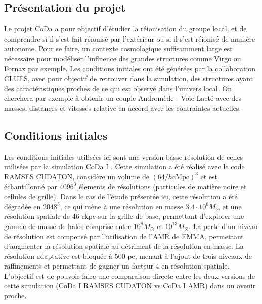 \subsection{Présentation du projet}

Le projet \ac{CoDa} a pour objectif d'étudier la réionisation du groupe local, et de comprendre si il s'est fait réionisé par l'extérieur ou si il s'est réionisé de manière autonome.
Pour se faire, un contexte cosmologique suffisamment large est nécessaire pour modéliser l'influence des grandes structures comme Virgo ou Fornax par exemple.
Les conditions initiales ont été générées par la collaboration \ac{CLUES}, avec pour objectif de retrouver dans la simulation, des structures ayant des caractéristiques proches de ce qui est observé dans l'univers local.
On cherchera par exemple à obtenir un couple Andromède - Voie Lacté avec des masses, distances et vitesses relative en accord avec les contraintes actuelles.

\subsection{Conditions initiales}
\label{sec:ICCODA}
Les conditions initiales utilisées ici sont une version basse résolution de celles utilisées par la simulation \ac{CoDa} I \citep{ocvirk_cosmic_2015}.
Cette simulation a été réalisé avec le code RAMSES CUDATON, %
considère un volume de $\left( 64/h \mathrm{cMpc} \right)^3$ et est échantillonné par $4096^3$ élements de résolutions (particules de matière noire et cellules de grille).
Dans le cas de l'étude présentée ici, cette résolution a été dégradée en $2048^3$, ce qui mène à une résolution en masse $3.4 \cdot 10^6 M_\odot$ et une résolution spatiale de 46 ckpc sur la grille de base, permettant d'explorer une gamme de masse de halos comprise entre $10^8 M_\odot$ et $10^{13}M_\odot$.
La perte d'un niveau de résolution est compensé par l'utilisation de l'\ac{AMR} de EMMA, permettant d’augmenter la résolution spatiale au détriment de la résolution en masse.
La résolution adaptative est bloquée à 500 pc, menant à l'ajout de trois niveaux de raffinements et permettant de gagner un facteur 4 en résolution spatiale.
L'objectif est de pouvoir faire une comparaison directe entre les deux versions de cette simulation (CoDa I RAMSES CUDATON vs CoDa I AMR) dans un avenir proche.


